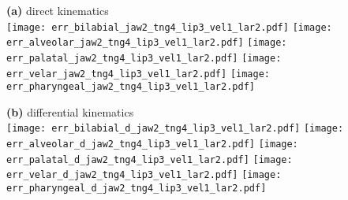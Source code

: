 \documentclass[varwidth=7.5in]{standalone}
\begin{document}
\raggedright

{\bf (a)} direct kinematics\\
\texttt{[image: err\_bilabial\_jaw2\_tng4\_lip3\_vel1\_lar2.pdf]}%
\texttt{[image: err\_alveolar\_jaw2\_tng4\_lip3\_vel1\_lar2.pdf]}%
\texttt{[image: err\_palatal\_jaw2\_tng4\_lip3\_vel1\_lar2.pdf]}%
\texttt{[image: err\_velar\_jaw2\_tng4\_lip3\_vel1\_lar2.pdf]}%
\texttt{[image: err\_pharyngeal\_jaw2\_tng4\_lip3\_vel1\_lar2.pdf]}

{\bf (b)} differential kinematics\\
\texttt{[image: err\_bilabial\_d\_jaw2\_tng4\_lip3\_vel1\_lar2.pdf]}%
\texttt{[image: err\_alveolar\_d\_jaw2\_tng4\_lip3\_vel1\_lar2.pdf]}%
\texttt{[image: err\_palatal\_d\_jaw2\_tng4\_lip3\_vel1\_lar2.pdf]}%
\texttt{[image: err\_velar\_d\_jaw2\_tng4\_lip3\_vel1\_lar2.pdf]}%
\texttt{[image: err\_pharyngeal\_d\_jaw2\_tng4\_lip3\_vel1\_lar2.pdf]}
\end{document}
